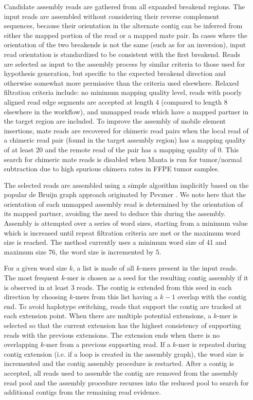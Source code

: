 \documentclass{article}
\begin{document}
Candidate assembly reads are gathered from all expanded breakend regions. The input reads are assembled without considering their reverse complement sequences, because their orientation in the alternate contig can be inferred from either the mapped portion of the read or a mapped mate pair. In cases where the orientation of the two breakends is not the same (such as for an inversion), input read orientation is standardized to be consistent with the first breakend. Reads are selected as input to the assembly process by similar criteria to those used for hypothesis generation, but specific to the expected breakend direction and otherwise somewhat more permissive than the criteria used elsewhere. Relaxed filtration criteria include: no minimum mapping quality level, reads with poorly aligned read edge segments are accepted at length 4 (compared to length 8 elsewhere in the workflow), and unmapped reads which have a mapped partner in the target region are included. To improve the assembly of mobile element insertions, mate reads are recovered for chimeric read pairs when the local read of a chimeric read pair (found in the target assembly region) has a mapping quality of at least 20 and the remote read of the pair has a mapping quality of 0. This search for chimeric mate reads is disabled when Manta is run for tumor/normal subtraction due to high spurious chimera rates in FFPE tumor samples.

The selected reads are assembled using a simple algorithm implicitly based on the popular de Bruijn graph approach originated by Pevzner \citep{pevzner2001}. We note here that the orientation of each unmapped assembly read is determined by the orientation of its mapped partner, avoiding the need to deduce this during the assembly. Assembly is attempted over a series of word sizes, starting from a minimum value which is increased until repeat filtration criteria are met or the maximum word size is reached. The method currently uses a minimum word size of 41 and maximum size 76, the word size is incremented by 5.

For a given word size $k$, a list is made of all $k$-mers present in the input reads. The most frequent $k$-mer is chosen as a seed for the resulting contig assembly if it is observed in at least 3 reads. The contig is extended from this seed in each direction by choosing $k$-mers from this list having a $k-1$ overlap with the contig end. To avoid haplotype switching, reads that support the contig are tracked at each extension point. When there are multiple potential extensions, a $k$-mer is selected so that the current extension has the highest consistency of supporting reads with the previous extensions. The extension ends when there is no overlapping $k$-mer from a previous supporting read. If a $k$-mer is repeated during contig extension (i.e. if a loop is created in the assembly graph), the word size is incremented and the contig assembly procedure is restarted. After a contig is accepted, all reads used to assemble the contig are removed from the assembly read pool and the assembly procedure recurses into the reduced pool to search for additional contigs from the remaining read evidence.
\end{document}
